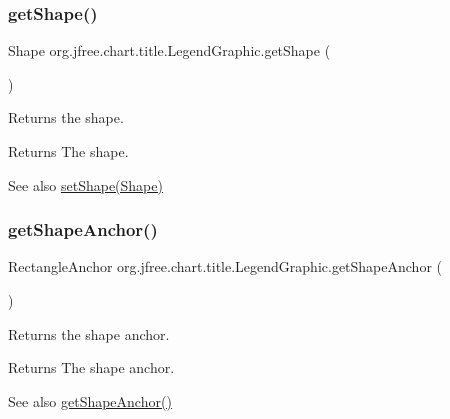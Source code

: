 \subsubsection{\texorpdfstring{get\+Shape()}{getShape()}}
{\footnotesize\ttfamily Shape org.\+jfree.\+chart.\+title.\+Legend\+Graphic.\+get\+Shape (\begin{DoxyParamCaption}{ }\end{DoxyParamCaption})}

Returns the shape.

\begin{DoxyReturn}{Returns}
The shape.
\end{DoxyReturn}
\begin{DoxySeeAlso}{See also}
\mbox{\hyperlink{classorg_1_1jfree_1_1chart_1_1title_1_1_legend_graphic_a31d10a0f353ee943dd459932f7dcfc99}{set\+Shape(\+Shape)}} 
\end{DoxySeeAlso}
\mbox{\label{classorg_1_1jfree_1_1chart_1_1title_1_1_legend_graphic_a04dfa116bb1d4aa8de4db26270c84501}} 
\subsubsection{\texorpdfstring{get\+Shape\+Anchor()}{getShapeAnchor()}}
{\footnotesize\ttfamily Rectangle\+Anchor org.\+jfree.\+chart.\+title.\+Legend\+Graphic.\+get\+Shape\+Anchor (\begin{DoxyParamCaption}{ }\end{DoxyParamCaption})}

Returns the shape anchor.

\begin{DoxyReturn}{Returns}
The shape anchor.
\end{DoxyReturn}
\begin{DoxySeeAlso}{See also}
\mbox{\hyperlink{classorg_1_1jfree_1_1chart_1_1title_1_1_legend_graphic_a04dfa116bb1d4aa8de4db26270c84501}{get\+Shape\+Anchor()}} 
\end{DoxySeeAlso}
\mbox{\label{classorg_1_1jfree_1_1chart_1_1title_1_1_legend_graphic_a270c25c2d4228d350f95aa6653f49bf8}} 
